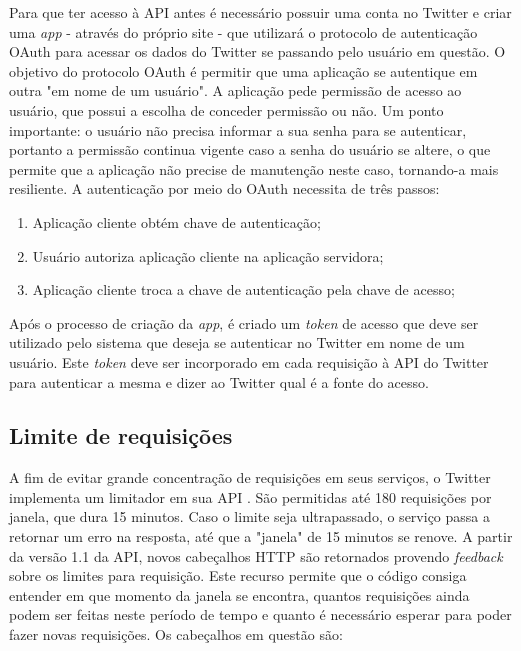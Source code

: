 Para que ter acesso à API antes é necessário possuir uma conta no Twitter e criar uma \textit{app} - através do próprio site \cite{twitterapp} - que utilizará o protocolo de autenticação OAuth\cite{oauth} para acessar os dados do Twitter se passando pelo usuário em questão. O objetivo do protocolo OAuth é permitir que uma aplicação se autentique em outra "em nome de um usuário". A aplicação pede permissão de acesso ao usuário, que possui a escolha de conceder permissão ou não. Um ponto importante: o usuário não precisa informar a sua senha para se autenticar, portanto a permissão continua vigente caso a senha do usuário se altere, o que permite que a aplicação não precise de manutenção neste caso, tornando-a mais resiliente. A autenticação por meio do OAuth necessita de três passos:

\begin{enumerate}
	\item Aplicação cliente obtém chave de autenticação;
	\item Usuário autoriza aplicação cliente na aplicação servidora;
	\item Aplicação cliente troca a chave de autenticação pela chave de acesso;
\end{enumerate}

Após o processo de criação da \textit{app}, é criado um \textit{token} de acesso que deve ser utilizado pelo sistema que deseja se autenticar no Twitter em nome de um usuário. Este \textit{token} deve ser incorporado em cada requisição à API do Twitter para autenticar a mesma e dizer ao Twitter qual é a fonte do acesso.

\subsection{Limite de requisições}
A fim de evitar grande concentração de requisições em seus serviços, o Twitter implementa um limitador em sua API \cite{twitterrequestlimit2016}. São permitidas até 180 requisições por janela, que dura 15 minutos. Caso o limite seja ultrapassado, o serviço passa a retornar um erro na resposta, até que a "janela" de 15 minutos se renove.
A partir da versão 1.1 da API, novos cabeçalhos \ac{HTTP} são retornados provendo \textit{feedback} sobre os limites para requisição. Este recurso permite que o código consiga entender em que momento da janela se encontra, quantos requisições ainda podem ser feitas neste período de tempo e quanto é necessário esperar para poder fazer novas requisições. Os cabeçalhos em questão são:

